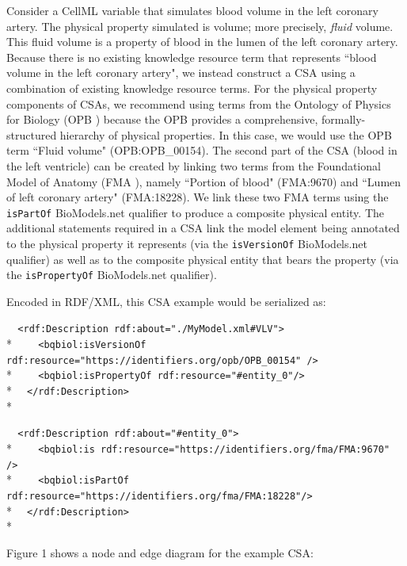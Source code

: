 \documentclass[pdftex,rgb,dvipsnames,svgnames,hyperref,table]{report}
\begin{document}
Consider a CellML variable that simulates blood volume in the left coronary artery. The physical property simulated is volume; more precisely, \textit{fluid} volume. This fluid volume is a property of blood in the lumen of the left coronary artery. Because there is no existing knowledge resource term that represents ``blood volume in the left coronary artery", we instead construct a CSA using a combination of existing knowledge resource terms. For the physical property components of CSAs, we recommend using terms from the Ontology of Physics for Biology (OPB \cite{OPB}) because the OPB provides a comprehensive, formally-structured hierarchy of physical properties. In this case, we would use the OPB term ``Fluid volume" (OPB:OPB\_00154). The second part of the CSA (blood in the left ventricle) can be created by linking two terms from the Foundational Model of Anatomy (FMA \cite{FMA}), namely ``Portion of blood" (FMA:9670) and ``Lumen of left coronary artery" (FMA:18228). We link these two FMA terms using the \texttt{isPartOf} BioModels.net qualifier to produce a composite physical entity. The additional statements required in a CSA link the model element being annotated to the physical property it represents (via the \texttt{isVersionOf} BioModels.net qualifier) as well as to the composite physical entity that bears the property (via the \texttt{isPropertyOf} BioModels.net qualifier).

Encoded in RDF/XML, this CSA example would be serialized as:

  \verb|  <rdf:Description rdf:about="./MyModel.xml#VLV">|\\*
  \verb|    <bqbiol:isVersionOf rdf:resource="https://identifiers.org/opb/OPB_00154" />|\\*
  \verb|    <bqbiol:isPropertyOf rdf:resource="#entity_0"/>|\\*
  \verb|  </rdf:Description>|\\*

  \verb|  <rdf:Description rdf:about="#entity_0">|\\*
  \verb|    <bqbiol:is rdf:resource="https://identifiers.org/fma/FMA:9670" />|\\*
  \verb|    <bqbiol:isPartOf rdf:resource="https://identifiers.org/fma/FMA:18228"/>|\\*
  \verb|  </rdf:Description>|\\*

Figure 1 shows a node and edge diagram for the example CSA:
\vspace{5mm}
\end{document}
